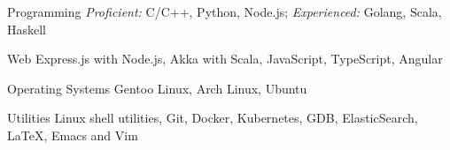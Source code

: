 


\begin{cvskills}


  \cvskill
  {Programming}
  {\textit{Proficient: } C/C++, Python, Node.js; \hspace{0.3cm}
    \textit{Experienced: } Golang, Scala, Haskell}


  \cvskill
  {Web}
  {Express.js with Node.js, Akka with Scala, JavaScript, TypeScript, Angular}


  \cvskill
  {Operating Systems}
  {Gentoo Linux, Arch Linux, Ubuntu}

  \cvskill
  {Utilities}
  {Linux shell utilities, Git, Docker,
    Kubernetes, GDB, ElasticSearch, \LaTeX, Emacs and Vim}


\end{cvskills}

